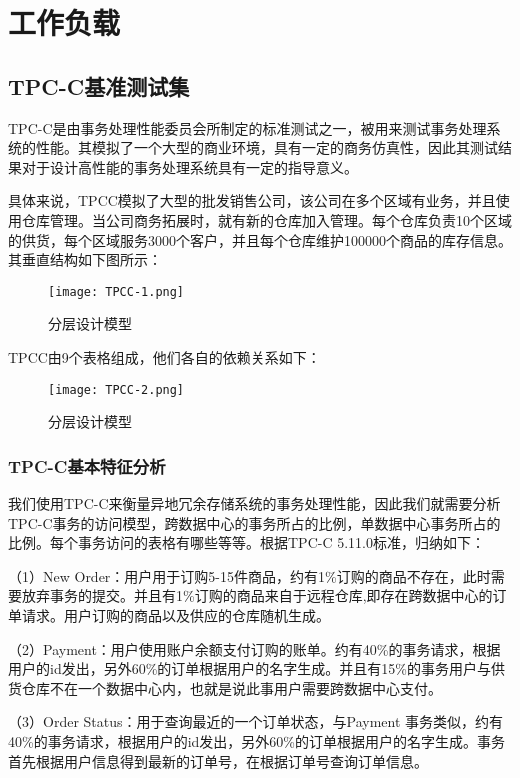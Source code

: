 
\chapter{工作负载}

\section{TPC-C基准测试集}
TPC-C\cite{TPCC}是由事务处理性能委员会所制定的标准测试之一，被用来测试事务处理系统的性能。其模拟了一个大型的商业环境，具有一定的商务仿真性，因此其测试结果对于设计高性能的事务处理系统具有一定的指导意义。

具体来说，TPCC模拟了大型的批发销售公司，该公司在多个区域有业务，并且使用仓库管理。当公司商务拓展时，就有新的仓库加入管理。每个仓库负责10个区域的供货，每个区域服务3000个客户，并且每个仓库维护100000个商品的库存信息。其垂直结构如下图所示：

\begin{figure}[htb]
  \centering
  \texttt{[image: TPCC-1.png]}
  \caption{分层设计模型}
  \label{fig:badge}
\end{figure}

TPCC由9个表格组成，他们各自的依赖关系如下：

\begin{figure}[htb]
  \centering
  \texttt{[image: TPCC-2.png]}
  \caption{分层设计模型}
  \label{fig:badge}
\end{figure}

\subsection{TPC-C基本特征分析}
我们使用TPC-C来衡量异地冗余存储系统的事务处理性能，因此我们就需要分析TPC-C事务的访问模型，跨数据中心的事务所占的比例，单数据中心事务所占的比例。每个事务访问的表格有哪些等等。根据TPC-C 5.11.0标准，归纳如下：

（1）New Order：用户用于订购5-15件商品，约有1\%订购的商品不存在，此时需要放弃事务的提交。并且有1\%订购的商品来自于远程仓库,即存在跨数据中心的订单请求。用户订购的商品以及供应的仓库随机生成。

（2）Payment：用户使用账户余额支付订购的账单。约有40\%的事务请求，根据用户的id发出，另外60\%的订单根据用户的名字生成。并且有15\%的事务用户与供货仓库不在一个数据中心内，也就是说此事用户需要跨数据中心支付。

（3）Order Status：用于查询最近的一个订单状态，与Payment 事务类似，约有40\%的事务请求，根据用户的id发出，另外60\%的订单根据用户的名字生成。事务首先根据用户信息得到最新的订单号，在根据订单号查询订单信息。

